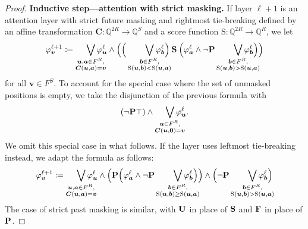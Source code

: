 \documentclass{article} %
\newcommand{\Q}{\mathbb{Q}}
\newcommand{\score}{\mathrm{S}}
\newcommand{\opbf}[1]{\textnormal{\textbf{#1}}}
\newcommand{\past}{\opbf{P}}
\newcommand{\future}{\opbf{F}}
\newcommand{\since}{\mathbin{\opbf{S}}}
\newcommand{\until}{\mathbin{\opbf{U}}}
\newcommand{\matC}{\boldsymbol{C}}
\newcommand{\vecb}{\boldsymbol{b}}
\newcommand{\veca}{\boldsymbol{a}}
\newcommand{\bnfdef}{\coloneqq}
\newcommand{\bv}{\boldsymbol{v}}
\newcommand{\bu}{\boldsymbol{u}}
\begin{document}
\begin{proof}
\medskip\noindent\textbf{Inductive step---attention with strict masking.}\quad
If layer $\ell+1$ is an attention layer with strict future masking and rightmost tie-breaking defined by an affine transformation
$\matC \colon \Q^{2R} \to \Q^S$ and a score function $\score \colon \Q^{2R} \to \Q^R$, we let
\begin{equation}
\varphi_{\bv}^{\ell+1} \bnfdef \smashoperator[r]{\bigvee_{\substack{\bu, \veca \in F^R, \\ \matC(\bu, \veca) = \bv}}} \varphi_{\bu}^\ell \wedge
\Big(\Big(\smashoperator[r]{\bigvee_{\substack{\vecb \in F^R, \\ \score(\bu, \vecb) < \score(\bu, \veca)}}} \varphi_{\vecb}^\ell\Big) \since
\Big(\varphi_{\veca}^\ell \wedge \neg\past \smashoperator[r]{\bigvee_{\substack{\vecb \in F^R, \\ \score(\bu, \vecb) > \score(\bu, \veca)}}}
\varphi_{\vecb}^\ell\Big)\Big)
\end{equation}
for all $\bv \in F^S$.
To account for the special case where the set of unmasked positions is empty, we take the disjunction of the previous formula with
\begin{equation}
(\neg\past\top) \wedge \smashoperator[r]{\bigvee_{\substack{\bu \in F^R, \\ \matC(\bu, \mathbf{0}) = \bv}}} \varphi_{\bu}^\ell.
\end{equation}
We omit this special case in what follows.
If the layer uses leftmost tie-breaking instead, we adapt the formula as follows:
\begin{equation}
\varphi_{\bv}^{\ell+1} \bnfdef \smashoperator[r]{\bigvee_{\substack{\bu, \veca \in F^R, \\ \matC(\bu, \veca) = \bv}}} \varphi_{\bu}^\ell \wedge
\Big(\past \Big(\varphi_{\veca}^\ell \wedge \neg\past \smashoperator[r]{\bigvee_{\substack{\vecb \in F^R, \\ \score(\bu, \vecb) \ge \score(\bu, \veca)}}}
\varphi_{\vecb}^\ell\Big)\Big) \wedge
\Big(\neg\past \smashoperator[r]{\bigvee_{\substack{\vecb \in F^R, \\ \score(\bu, \vecb) > \score(\bu, \veca)}}}
\varphi_{\vecb}^\ell\Big)
\end{equation}
The case of strict past masking is similar, with $\until$ in place of $\since$ and $\future$ in place of $\past$.


\end{proof}
\end{document}
